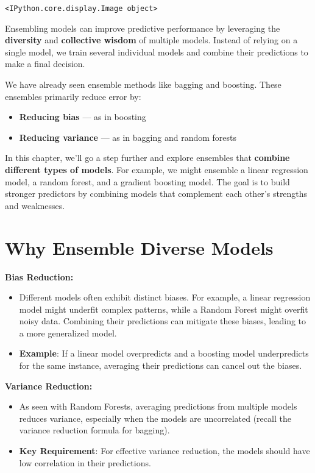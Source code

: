 \documentclass[
  letterpaper,
  DIV=11,
  numbers=noendperiod]{scrreprt}
\providecommand{\tightlist}{%
  \setlength{\itemsep}{0pt}\setlength{\parskip}{0pt}}\usepackage{longtable,booktabs,array}
\begin{document}
\begin{verbatim}
<IPython.core.display.Image object>
\end{verbatim}

Ensembling models can improve predictive performance by leveraging the
\textbf{diversity} and \textbf{collective wisdom} of multiple models.
Instead of relying on a single model, we train several individual models
and combine their predictions to make a final decision.

We have already seen ensemble methods like bagging and boosting. These
ensembles primarily reduce error by:

\begin{itemize}
\item
  \textbf{Reducing bias} --- as in boosting
\item
  \textbf{Reducing variance} --- as in bagging and random forests
\end{itemize}

In this chapter, we'll go a step further and explore ensembles that
\textbf{combine different types of models}. For example, we might
ensemble a linear regression model, a random forest, and a gradient
boosting model. The goal is to build stronger predictors by combining
models that complement each other's strengths and weaknesses.

\section{Why Ensemble Diverse Models}\label{why-ensemble-diverse-models}

\textbf{Bias Reduction:}

\begin{itemize}
\tightlist
\item
  Different models often exhibit distinct biases. For example, a linear
  regression model might underfit complex patterns, while a Random
  Forest might overfit noisy data. Combining their predictions can
  mitigate these biases, leading to a more generalized model.
\item
  \textbf{Example}: If a linear model overpredicts and a boosting model
  underpredicts for the same instance, averaging their predictions can
  cancel out the biases.
\end{itemize}

\textbf{Variance Reduction:}

\begin{itemize}
\tightlist
\item
  As seen with Random Forests, averaging predictions from multiple
  models reduces variance, especially when the models are uncorrelated
  (recall the variance reduction formula for bagging).
\item
  \textbf{Key Requirement}: For effective variance reduction, the models
  should have low correlation in their predictions.
\end{itemize}
\end{document}
